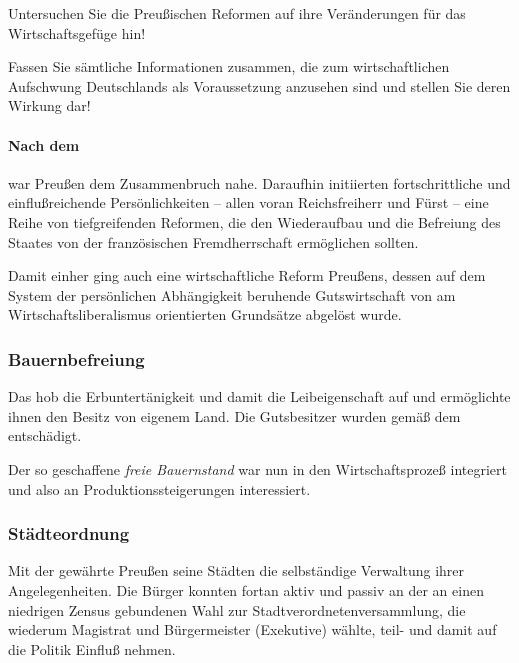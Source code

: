 \begin{aufgabe}
Untersuchen Sie die Preußischen Reformen auf ihre Veränderungen
für das Wirtschaftsgefüge hin!

Fassen Sie sämtliche Informationen zusammen, die zum wirtschaftlichen
Aufschwung Deutschlands als Voraussetzung anzusehen sind und stellen
Sie deren Wirkung dar!
\end{aufgabe}

\paragraph{Nach dem } war Preußen
dem Zusammenbruch nahe. Daraufhin initiierten fortschrittliche und
einflußreichende Persönlichkeiten -- allen voran Reichsfreiherr
 und Fürst
 -- eine
Reihe von tiefgreifenden Reformen, die den Wiederaufbau und die
Befreiung des Staates von der französischen Fremdherrschaft
ermöglichen sollten.

Damit einher ging auch eine wirtschaftliche Reform Preußens, dessen
auf dem System der persönlichen Abhängigkeit beruhende Gutswirtschaft
von am Wirtschaftsliberalismus orientierten Grundsätze abgelöst
wurde.

\subsubsection{Bauernbefreiung}

Das  hob die Erbuntertänigkeit und damit
die Leibeigenschaft auf und ermöglichte ihnen den Besitz von eigenem
Land. Die Gutsbesitzer wurden gemäß dem  entschädigt.

Der so geschaffene \emph{freie Bauernstand} war nun in den
Wirtschaftsprozeß integriert und also an Produktionssteigerungen
interessiert.

\subsubsection{Städteordnung}

Mit der  gewährte Preußen seine
Städten die selbständige Verwaltung ihrer Angelegenheiten. Die Bürger
konnten fortan aktiv und passiv an der an einen niedrigen Zensus
gebundenen Wahl zur Stadtverordnetenversammlung, die
wiederum Magistrat und Bürgermeister (Exekutive) wählte, teil- und
damit auf die Politik Einfluß nehmen.

